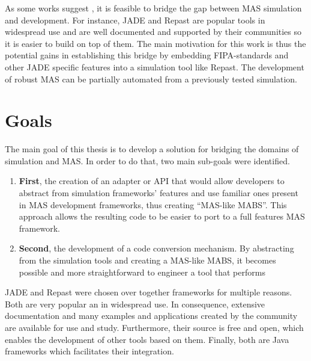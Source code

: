 As some works suggest \cite{gormer2011jrep,garcia2011misia,warden2010towards}, it is feasible to bridge the gap between MAS simulation and development. For instance, JADE and Repast are popular tools in widespread use and are well documented and supported by their communities so it is easier to build on top of them. The main motivation for this work is thus the potential gains in establishing this bridge by embedding FIPA-standards and other JADE specific features into a simulation tool like Repast. The development of robust MAS can be partially automated from a previously tested simulation.

\section{Goals}
The main goal of this thesis is to develop a solution for bridging the domains of simulation and MAS. In order to do that, two main sub-goals were identified.

\begin{enumerate}
	\item \textbf{First}, the creation of an adapter or API that would allow developers to abstract from simulation frameworks' features and use familiar ones present in MAS development frameworks, thus creating ``MAS-like MABS''. This approach allows the resulting code to be easier to port to a full features MAS framework.
	\item \textbf{Second}, the development of a code conversion mechanism. By abstracting from the simulation tools and creating a MAS-like MABS, it becomes possible and more straightforward to engineer a tool that performs
\end{enumerate}

JADE and Repast were chosen over together frameworks for multiple reasons. Both are very popular an in widespread use. In consequence, extensive documentation and many examples and applications created by the community are available for use and study. Furthermore, their source is free and open, which enables the development of other tools based on them. Finally, both are Java frameworks which facilitates their integration.

